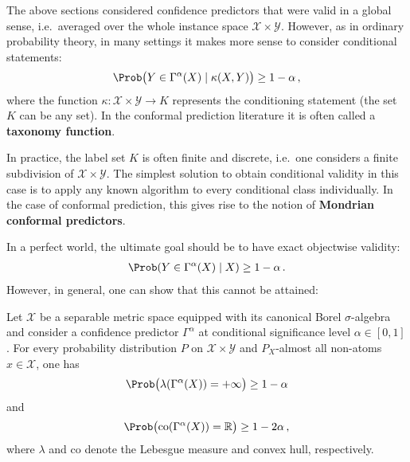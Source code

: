     The above sections considered confidence predictors that were valid in a global sense, i.e.~averaged over the whole instance space $\mathcal{X}\times\mathcal{Y}$. However, as in ordinary probability theory, in many settings it makes more sense to consider conditional statements:
    \begin{gather}
        \label{data:conditional_validity_condition}
        \Prob\bigl(Y\in\Gamma^\alpha(X)\mid\kappa(X,Y)\bigr)\geq 1-\alpha\,,
    \end{gather}
    where the function $\kappa:\mathcal{X}\times\mathcal{Y}\rightarrow K$ represents the conditioning statement (the set $K$ can be any set). In the conformal prediction literature it is often called a \textbf{taxonomy function}.

    In practice, the label set $K$ is often finite and discrete, i.e.~one considers a finite subdivision of $\mathcal{X}\times\mathcal{Y}$. The simplest solution to obtain conditional validity in this case is to apply any known algorithm to every conditional class individually. In the case of conformal prediction, this gives rise to the notion of \textbf{Mondrian conformal predictors}.

    In a perfect world, the ultimate goal should be to have exact objectwise validity:
    \begin{gather}
        \Prob(Y\in\Gamma^\alpha(X)\mid X)\geq 1-\alpha\,.
    \end{gather}
    However, in general, one can show that this cannot be attained:
    \begin{property}[No-go theorem]
        Let $\mathcal{X}$ be a separable metric space equipped with its canonical Borel $\sigma$-algebra and consider a confidence predictor $\Gamma^\alpha$ at conditional significance level $\alpha\in[0,1]$. For every probability distribution $P$ on $\mathcal{X}\times\mathcal{Y}$ and $P_X$-almost all non-atoms $x\in\mathcal{X}$, one has
        \begin{gather}
            \Prob\bigl(\lambda(\Gamma^\alpha(X))=+\infty\bigr)\geq 1-\alpha
        \end{gather}
        and
        \begin{gather}
            \Prob\bigl(\mathrm{co}(\Gamma^\alpha(X))=\mathbb{R}\bigr)\geq 1-2\alpha\,,
        \end{gather}
        where $\lambda$ and $\mathrm{co}$ denote the Lebesgue measure and convex hull, respectively.
    \end{property}

